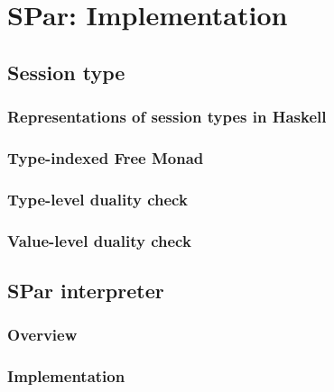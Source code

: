 \chapter{SPar: Implementation}
\section{Session type} \label{impl:sec:session}
\subsection{Representations of session types in Haskell}
\subsection{Type-indexed Free Monad}
\subsection{Type-level duality check}
\subsection{Value-level duality check}
\section{SPar interpreter} \label{impl:sec:interp}
\subsection{Overview}
\subsection{Implementation}